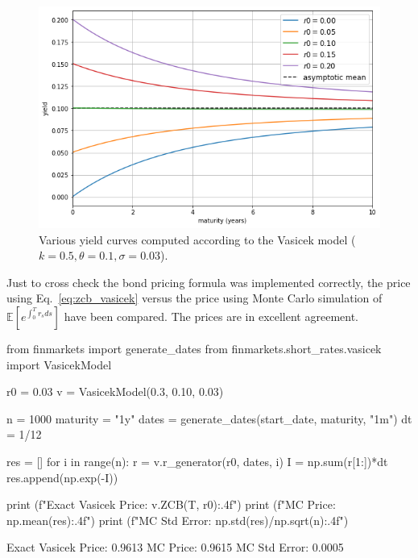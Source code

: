 \begin{figure}[htb]
    \centering
    \includegraphics[width=0.7\linewidth]{figures/vasicek_yields}
    \caption{Various yield curves computed according to the Vasicek model ($k=0.5, \theta=0.1, \sigma=0.03$).}
    \label{fig:yield_vasicek}
\end{figure}

Just to cross check the bond pricing formula was implemented correctly, the price using Eq.~\ref{eq:zcb_vasicek} versus the price using Monte Carlo simulation of $\mathbb{E}\left[e^{\int_0^T r_s ds}\right]$ have been compared. The prices are in excellent agreement.

\begin{ipython}
from finmarkets import generate_dates
from finmarkets.short_rates.vasicek import VasicekModel
  
r0 = 0.03
v = VasicekModel(0.3, 0.10, 0.03)

n = 1000
maturity = "1y"
dates = generate_dates(start_date, maturity, "1m")
dt = 1/12

res = []
for i in range(n):
    r = v.r_generator(r0, dates, i)
    I = np.sum(r[1:])*dt
    res.append(np.exp(-I))

print (f"Exact Vasicek Price: {v.ZCB(T, r0):.4f}")
print (f"MC Price: {np.mean(res):.4f}")
print (f"MC Std Error: {np.std(res)/np.sqrt(n):.4f}")
\end{ipython}
\begin{ioutput}
Exact Vasicek Price: 0.9613
MC Price: 0.9615
MC Std Error: 0.0005
\end{ioutput}

